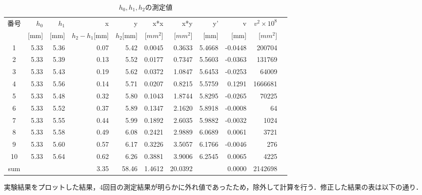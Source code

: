 \documentclass[a4paper,1pt]{jsarticle}
\begin{document}
\begin{table}[H]
  \caption{$h_0,h_1,h_2$の測定値}
  \label{table:SpeedOfLight}
  \centering
  \begin{tabular}{|c||r|r|r|r|r|r|r|r|r|r|}
    \hline
    番号 & $h_0$ & $h_1$ & x & y & x*x & x*y & y' & v & $v^2\times10^8$\\
    &[mm] & [mm] & $h_2-h_1$[mm] & $h_2$[mm] & [$mm^2$] & [$mm^2$] & [mm] & [mm] & [$mm^2$]\\
    \hline \hline
    1 & 5.33 & 5.36 & 0.07 & 5.42 & 0.0045 & 0.3633 & 5.4668 & -0.0448 & 200704 \\
    2 & 5.33 & 5.39 & 0.13 & 5.52 & 0.0177 & 0.7347 & 5.5603 & -0.0363 & 131769 \\
    3 & 5.33 & 5.43 & 0.19 & 5.62 & 0.0372 & 1.0847 & 5.6453 & -0.0253 & 64009 \\
    4 & 5.33 & 5.56 & 0.14 & 5.71 & 0.0207 & 0.8215 & 5.5759 & 0.1291 & 1666681 \\
    5 & 5.33 & 5.48 & 0.32 & 5.80 & 0.1043 & 1.8744 & 5.8295 & -0.0265 & 70225 \\
    6 & 5.33 & 5.52 & 0.37 & 5.89 & 0.1347 & 2.1620 & 5.8918 & -0.0008 & 64 \\
    7 & 5.33 & 5.55 & 0.44 & 5.99 & 0.1892 & 2.6035 & 5.9882 & -0.0032 & 1024 \\
    8 & 5.33 & 5.58 & 0.49 & 6.08 & 0.2421 & 2.9889 & 6.0689 & 0.0061 & 3721 \\
    9 & 5.33 & 5.60 & 0.57 & 6.17 & 0.3226 & 3.5057 & 6.1766 & -0.0046 & 276 \\
    10 & 5.33 & 5.64 & 0.62 & 6.26 & 0.3881 & 3.9006 & 6.2545 & 0.0065 & 4225 \\
    \hline
    sum &  &  & 3.35 & 58.46 & 1.4612 & 20.0392 &  & 0.0000 & 2142698 \\
    \hline
  \end{tabular}


\end{table}

実験結果をプロットした結果，4回目の測定結果が明らかに外れ値であったため，除外して計算を行う．修正した結果の表は以下の通り．
\end{document}
